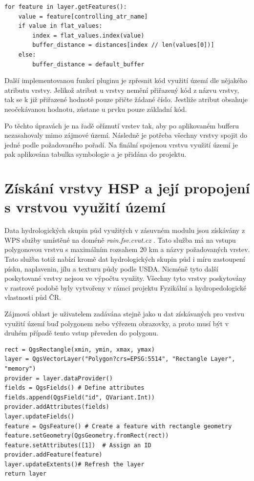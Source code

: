 \documentclass[a4paper,oneside,12pt]{book}
\begin{document}
\begin{lstlisting}[style=mypython, caption={Přiřazení velikosti bufferu}, label={kod:buffer}]
for feature in layer.getFeatures():
    value = feature[controlling_atr_name]
    if value in flat_values:
        index = flat_values.index(value)
        buffer_distance = distances[index // len(values[0])]
    else:
        buffer_distance = default_buffer
\end{lstlisting}

\hspace{10mm}Další implementovanou funkcí pluginu je zpřesnit kód využití území dle nějakého atributu vrstvy. Jelikož atribut u vrstvy nemění přiřazený kód z názvu vrstvy, tak se k již přiřazené hodnotě pouze přičte žádané číslo. Jestliže atribut obsahuje neočekávanou hodnotu, zůstane u prvku pouze základní kód.

 \hspace{10mm}Po těchto úpravách je na řadě oříznutí vrstev tak, aby po aplikovaném bufferu nezasahovaly mimo zájmové území. Následně je potřeba všechny vrstvy spojit do jedné podle požadovaného pořadí. Na finální spojenou vrstvu využití území je pak aplikována tabulka symbologie a je přidána do projektu.
 
\section{Získání vrstvy HSP a její propojení s vrstvou využití území} \label{intersection}
 \hspace{10mm}Data hydrologických skupin půd využitých v zásuvném modulu jsou získávány z WPS služby umístěné na doméně \textit{rain.fsv.cvut.cz} . Tato služba má na vstupu polygonovou vrstvu s maximálním rozsahem 20 km a názvy požadovaných vrstev. Tato služba totiž nabízí kromě dat hydrologických skupin půd i míru zastoupení písku, naplavenin, jílu a texturu půdy podle USDA. Nicméně tyto další poskytované vrstvy nejsou ve výpočtu využity. Všechny tyto vrstvy poskytovány v rastrové podobě byly vytvořeny v rámci projektu Fyzikální a hydropedologické vlastnosti půd ČR.

 \hspace{10mm}Zájmová oblast je uživatelem zadávána stejně jako u dat získávaných pro vrstvu využití území buď polygonem nebo výřezem obrazovky, a proto musí být v druhém případě tento vstup převeden do polygonu.  
\begin{lstlisting}[style=mypython, caption={Převod výřezu obrazovky na polygon},label={kod:extenttoplg}]
rect = QgsRectangle(xmin, ymin, xmax, ymax)
layer = QgsVectorLayer("Polygon?crs=EPSG:5514", "Rectangle Layer", "memory")
provider = layer.dataProvider()
fields = QgsFields() # Define attributes
fields.append(QgsField("id", QVariant.Int))
provider.addAttributes(fields)
layer.updateFields()
feature = QgsFeature() # Create a feature with rectangle geometry
feature.setGeometry(QgsGeometry.fromRect(rect))
feature.setAttributes([1])  # Assign an ID
provider.addFeature(feature)
layer.updateExtents()# Refresh the layer
return layer
\end{lstlisting}
\end{document}
